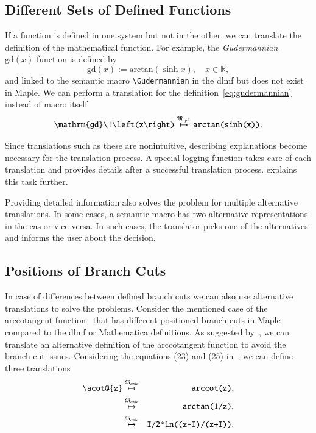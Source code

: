 \documentclass[a4paper,11pt]{article}
\newcommand{\Maple}{Maple}
\newcommand{\Mathematica}{Mathematica}
\newcommand{\langMaple}{\mathfrak{M}_{aple}}
\theoremstyle{defTheoStyle}
\theoremstyle{defExampStyle}
\DeclareRobustCommand{\Real}{\mathbb{R}}
\newcommand{\Gudermannian}[1]{\mathrm{gd}\!\left(#1\right)}
\newcommand{\atan}[1]{\mathrm{arctan}\!\left(#1\right)}
\begin{document}
\subsection{Different Sets of Defined Functions}
If a function is defined in one system but not in the other, we can translate the definition of the mathematical function. For example, the \textit{Gudermannian}~\parencite[(4.23.10)]{NIST:DLMF} $\Gudermannian{x}$ function is defined by
\begin{equation}\label{eq:gudermannian}
\Gudermannian{x} := \atan{\sinh{x}}, \quad x \in \Real,
\end{equation}
and linked to the semantic macro \verb|\Gudermannian| in the \gls*{dlmf} but does not exist in \Maple. We can perform a translation for the definition~\eqref{eq:gudermannian} instead of macro itself
\begin{equation}\label{eq:guder-trans}
\verb|\Gudermannian{x}| \overset{\langMaple}{\mapsto} \texttt{arctan(sinh(x))}.
\end{equation}

\vspace{-0.2cm}
Since translations such as these are nonintuitive, describing explanations become necessary for the translation process. A special logging function takes care of each translation and provides details after a successful translation process.  explains this task further.

Providing detailed information also solves the problem for multiple alternative translations. In some cases, a semantic macro has two alternative representations in the \gls*{cas} or vice versa. In such cases, the translator picks one of the alternatives and informs the user about the decision.

\subsection{Positions of Branch Cuts}
In case of differences between defined branch cuts we can also use alternative translations to solve the problems. Consider the mentioned case of the arccotangent function~\parencite{Branches:acot} that has different positioned branch cuts in \Maple{} compared to the \gls*{dlmf} or \Mathematica{} definitions. As suggested by~\parencite{Branches:acot}, we can translate an alternative definition of the arccotangent function to avoid the branch cut issues. Considering the equations (23) and (25) in~\parencite{Branches:acot}, we can define three translations
\begin{eqnarray}
\verb|\acot@{z}| & \overset{\langMaple}{\mapsto} & \verb|arccot(z)|,\label{eq:acot-alternatives}\\
& \overset{\langMaple}{\mapsto} & \verb|arctan(1/z)|,\label{eq:acot-alternatives-1}\\
& \overset{\langMaple}{\mapsto} & \verb|I/2*ln((z-I)/(z+I))|.\label{eq:acot-alternatives-2}
\end{eqnarray}
\end{document}

